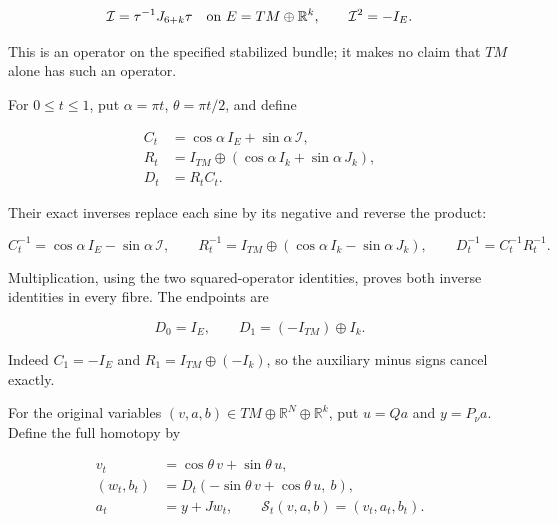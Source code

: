 \begin{equation}
\mathcal I=\tau^{-1}J_{6+k}\tau
        \quad\hbox{on }E=TM\oplus\mathbb R^k,\qquad
 \mathcal I^2=-I_E .
 \label{courseIII:sphere-twists-and-the-original-smooth-six-sphere-comparison:eq:7.10}
\end{equation}

This is an operator on the specified stabilized bundle; it makes no claim that \(TM\) alone has such an operator.

For \(0\le t\le1\), put \(\alpha=\pi t\), \(\theta=\pi t/2\), and define

\begin{equation}
\begin{split}
 C_t&=\cos\alpha\,I_E+\sin\alpha\,\mathcal I,\\
 R_t&=I_{TM}\oplus(\cos\alpha\,I_k+\sin\alpha\,J_k),\\
 D_t&=R_tC_t .
 \end{split}
 \label{courseIII:sphere-twists-and-the-original-smooth-six-sphere-comparison:eq:7.11}
\end{equation}

Their exact inverses replace each sine by its negative and reverse the product:

\begin{equation}
C_t^{-1}=\cos\alpha\,I_E-\sin\alpha\,\mathcal I,\qquad
 R_t^{-1}=I_{TM}\oplus(\cos\alpha\,I_k-\sin\alpha\,J_k),\qquad
 D_t^{-1}=C_t^{-1}R_t^{-1}.
 \label{courseIII:sphere-twists-and-the-original-smooth-six-sphere-comparison:eq:7.12}
\end{equation}

Multiplication, using the two squared-operator identities, proves both inverse identities in every fibre. The endpoints are

\begin{equation}
D_0=I_E,\qquad D_1=(-I_{TM})\oplus I_k .
 \label{courseIII:sphere-twists-and-the-original-smooth-six-sphere-comparison:eq:7.13}
\end{equation}

Indeed \(C_1=-I_E\) and \(R_1=I_{TM}\oplus(-I_k)\), so the auxiliary minus signs cancel exactly.

For the original variables \((v,a,b)\in TM\oplus\mathbb R^N\oplus\mathbb R^k\), put \(u=Qa\) and \(y=P_\nu a\). Define the full homotopy by

\begin{equation}
\begin{split}
 v_t&=\cos\theta\,v+\sin\theta\,u,\\
 (w_t,b_t)&=D_t(-\sin\theta\,v+\cos\theta\,u,\ b),\\
 a_t&=y+Jw_t,\qquad
 \mathcal S_t(v,a,b)=(v_t,a_t,b_t).
 \end{split}
 \label{courseIII:sphere-twists-and-the-original-smooth-six-sphere-comparison:eq:7.14}
\end{equation}

